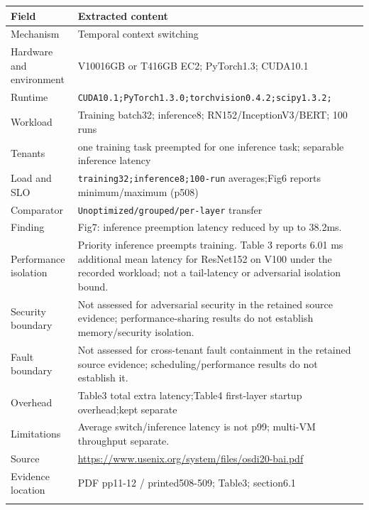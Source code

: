 \cite{P004}

\begin{longtable}{>{\raggedright\arraybackslash}p{}>{\raggedright\arraybackslash}p{}}
\toprule
\textbf{Field} & \textbf{Extracted content}\\\midrule\endhead
Mechanism & Temporal context switching\\\addlinespace
Hardware and environment & V10016GB or T416GB EC2; PyTorch1.3; CUDA10.1\\\addlinespace
Runtime & \nolinkurl{CUDA10.1;PyTorch1.3.0;torchvision0.4.2;scipy1.3.2;}\\\addlinespace
Workload & Training batch32; inference8; RN152/InceptionV3/BERT; 100 runs\\\addlinespace
Tenants & one training task preempted for one inference task; separable inference latency\\\addlinespace
Load and SLO & \nolinkurl{training32;inference8;100-run} averages;Fig6 reports minimum/maximum (p508)\\\addlinespace
Comparator & \nolinkurl{Unoptimized/grouped/per-layer} transfer\\\addlinespace
Finding & Fig7: inference preemption latency reduced by up to 38.2ms.\\\addlinespace
Performance isolation & Priority inference preempts training. Table 3 reports 6.01 ms additional mean latency for ResNet152 on V100 under the recorded workload; not a tail-latency or adversarial isolation bound.\\\addlinespace
Security boundary & Not assessed for adversarial security in the retained source evidence; performance-sharing results do not establish memory/security isolation.\\\addlinespace
Fault boundary & Not assessed for cross-tenant fault containment in the retained source evidence; scheduling/performance results do not establish it.\\\addlinespace
Overhead & Table3 total extra latency;Table4 first-layer startup overhead;kept separate\\\addlinespace
Limitations & Average switch/inference latency is not p99; multi-VM throughput separate.\\\addlinespace
Source & \url{https://www.usenix.org/system/files/osdi20-bai.pdf}\\\addlinespace
Evidence location & PDF pp11-12 / printed508-509; Table3; section6.1\\\addlinespace
\bottomrule\end{longtable}

